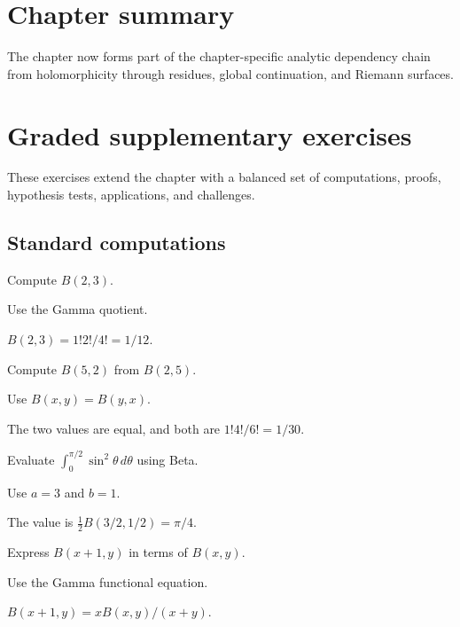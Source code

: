 \section*{Chapter summary}
The chapter now forms part of the chapter-specific analytic dependency chain from holomorphicity through residues, global continuation, and Riemann surfaces.
\section{Graded supplementary exercises}
These exercises extend the chapter with a balanced set of computations, proofs, hypothesis tests, applications, and challenges.

\subsection*{Standard computations}

\begin{exercise}\label{exr:iv20-expand-01}
Compute \(B(2,3)\).
\end{exercise}
\begin{hint}
Use the Gamma quotient.
\end{hint}
\begin{solution}
\(B(2,3)=1!2!/4!=1/12\).
\end{solution}

\begin{exercise}[Symmetry]\label{exr:iv20-expand-02}
Compute \(B(5,2)\) from \(B(2,5)\).
\end{exercise}
\begin{hint}
Use \(B(x,y)=B(y,x)\).
\end{hint}
\begin{solution}
The two values are equal, and both are \(1!4!/6!=1/30\).
\end{solution}

\begin{exercise}\label{exr:iv20-expand-03}
Evaluate \(\int_0^{\pi/2}\sin^2\theta\,d\theta\) using Beta.
\end{exercise}
\begin{hint}
Use \(a=3\) and \(b=1\).
\end{hint}
\begin{solution}
The value is \(\frac12B(3/2,1/2)=\pi/4\).
\end{solution}

\begin{exercise}[Recurrence]\label{exr:iv20-expand-04}
Express \(B(x+1,y)\) in terms of \(B(x,y)\).
\end{exercise}
\begin{hint}
Use the Gamma functional equation.
\end{hint}
\begin{solution}
\(B(x+1,y)=xB(x,y)/(x+y)\).
\end{solution}

